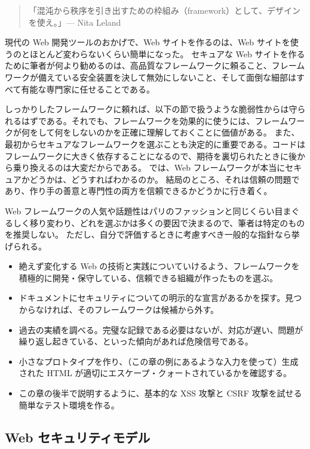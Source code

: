 \documentclass[uplatex]{jsarticle}
\def\label#1{}%
\begin{document}
\begin{quote}
「混沌から秩序を引き出すための枠組み（framework）として、デザインを使え。」\hfill --- Nita Leland
\end{quote}

現代の Web 開発ツールのおかげで、Web サイトを作るのは、Web サイトを使うのとほとんど変わらないくらい簡単になった。
セキュアな Web サイトを作るために筆者が何より勧めるのは、高品質なフレームワークに頼ること、フレームワークが備えている安全装置を決して無効にしないこと、そして面倒な細部はすべて有能な専門家に任せることである。

しっかりしたフレームワークに頼れば、以下の節で扱うような脆弱性からは守られるはずである。それでも、フレームワークを効果的に使うには、フレームワークが何をして何をしないのかを正確に理解しておくことに価値がある。
また、最初からセキュアなフレームワークを選ぶことも決定的に重要である。コードはフレームワークに大きく依存することになるので、期待を裏切られたときに後から乗り換えるのは大変だからである。
では、Web フレームワークが本当にセキュアかどうかは、どうすればわかるのか。
結局のところ、それは信頼の問題であり、作り手の善意と専門性の両方を信頼できるかどうかに行き着く。

Web フレームワークの人気や話題性はパリのファッションと同じくらい目まぐるしく移り変わり、どれを選ぶかは多くの要因で決まるので、筆者は特定のものを推奨しない。
ただし、自分で評価するときに考慮すべき一般的な指針なら挙げられる。
\begin{itemize}
\item 絶えず変化する Web の技術と実践についていけるよう、フレームワークを積極的に開発・保守している、信頼できる組織が作ったものを選ぶ。
\item ドキュメントにセキュリティについての明示的な宣言があるかを探す。見つからなければ、そのフレームワークは候補から外す。
\item 過去の実績を調べる。完璧な記録である必要はないが、対応が遅い、問題が繰り返し起きている、といった傾向があれば危険信号である。
\item 小さなプロトタイプを作り、（この章の例にあるような入力を使って）生成された HTML が適切にエスケープ・クォートされているかを確認する。
\item この章の後半で説明するように、基本的な XSS 攻撃と CSRF 攻撃を試せる簡単なテスト環境を作る。
\end{itemize}

\subsection{Web セキュリティモデル}\label{subsec:ch11-web-security-model}
\end{document}
